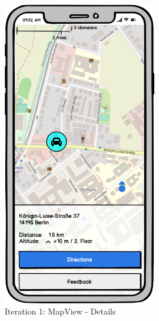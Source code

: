 \begin{figure}[H]
\begin{minipage}[b]{0.45\textwidth}
    \includegraphics[width=0.6\textwidth]{images/UI/Iteration1-MapView-Details.png}
    \caption{Iteration 1: MapView - Details}
    \label{fig:i1-mv-details}
  \end{minipage}
\end{figure}


